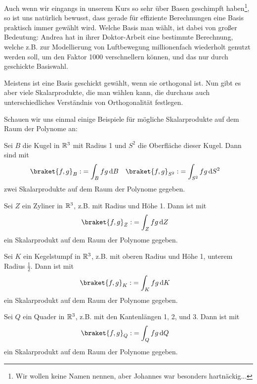 Auch wenn wir eingangs in unserem Kurs so sehr über Basen geschimpft haben\footnote{Wir wollen keine Namen nennen, aber Johannes war besonders hartnäckig...}, so ist uns natürlich bewusst, dass gerade für effiziente Berechnungen eine Basis praktisch immer gewählt wird. Welche Basis man wählt, ist dabei von großer Bedeutung: Andrea hat in ihrer Doktor-Arbeit eine bestimmte Berechnung, welche z.B. zur Modellierung von Luftbewegung millionenfach wiederholt genutzt werden soll, um den Faktor 1000 verschnellern können, und das nur durch geschickte Basiswahl. 

\begin{remark}
	Meistens ist eine Basis geschickt gewählt, wenn sie orthogonal ist. Nun gibt es aber viele Skalarprodukte, die man wählen kann, die durchaus auch unterschiedliches Verständnis von Orthogonalität festlegen.
\end{remark}
Schauen wir uns einmal einige Beispiele für mögliche Skalarprodukte auf dem Raum der Polynome an:
\begin{example}
	Sei $B$ die Kugel in $\mathbb{R}^3$ mit Radius 1 und $S^2$ die Oberfläche dieser Kugel. Dann sind mit
	\begin{align*}
		\braket{f,g}_B :&= \int_B f g \dd B & \braket{f,g}_{S^2} :&= \int_{S^2} f g \dd {S^2}
	\end{align*}
	zwei Skalarprodukte auf dem Raum der Polynome gegeben.
\end{example}

\begin{example}
	Sei $Z$ ein Zyliner in $\mathbb{R}^3$, z.B. mit Radius und Höhe 1. Dann ist mit 
	\begin{align*}
		\braket{f,g}_Z :&= \int_Z f g \dd Z
	\end{align*}
	ein Skalarprodukt auf dem Raum der Polynome gegeben.
\end{example}

\begin{example}
	Sei $K$ ein Kegelstumpf in $\mathbb{R}^3$, z.B. mit oberen Radius und Höhe 1, unterem Radius $\frac{1}{2}$. Dann ist mit 
	\begin{align*}
		\braket{f,g}_K :&= \int_K f g \dd K
	\end{align*}
	ein Skalarprodukt auf dem Raum der Polynome gegeben.
\end{example}

\begin{example}
	Sei $Q$ ein Quader in $\mathbb{R}^3$, z.B. mit den Kantenlängen 1, 2, und 3. Dann ist mit 
	\begin{align*}
		\braket{f,g}_Q :&= \int_Q f g \dd Q
	\end{align*}
	ein Skalarprodukt auf dem Raum der Polynome gegeben.
\end{example}

